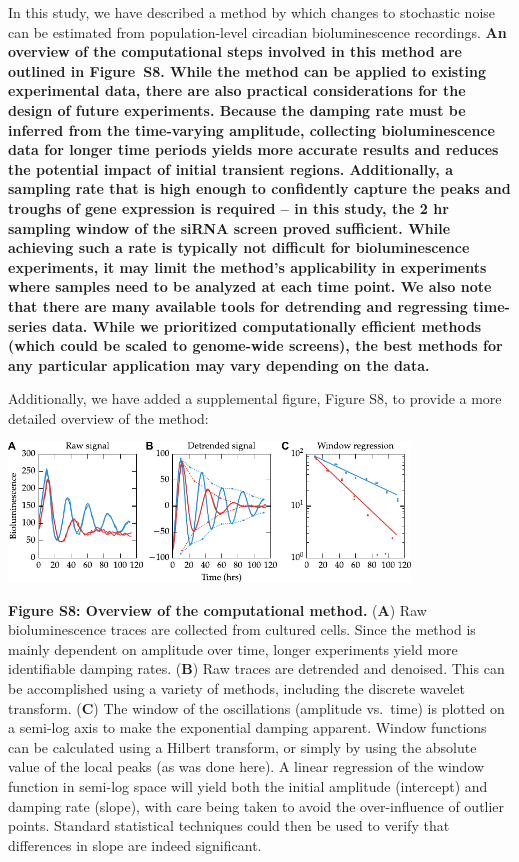 \documentclass[11pt, letterpaper]{article}
\newenvironment{manuscript}[1]{\begin{center}\begin{tcolorbox}[colback=green!5!white,colframe=green!75!black,width=\textwidth,title={#1},breakable,fonttitle=\bfseries]}{\end{tcolorbox}\end{center}}
\begin{document}
\begin{manuscript}{Page 15}
 In this study, we have described a method by which changes to stochastic noise can be estimated from population-level circadian bioluminescence recordings.
 {\bfseries
An overview of the computational steps involved in this method are outlined in Figure~S8.
While the method can be applied to existing experimental data, there are also practical considerations for the design of future experiments.
Because the damping rate must be inferred from the time-varying amplitude, collecting bioluminescence data for longer time periods yields more accurate results and reduces the potential impact of initial transient regions.
Additionally, a sampling rate that is high enough to confidently capture the peaks and troughs of gene expression is required -- in this study, the 2 hr sampling window of the siRNA screen proved sufficient.
While achieving such a rate is typically not difficult for bioluminescence experiments, it may limit the method's applicability in experiments where samples need to be analyzed at each time point.
We also note that there are many available tools for detrending and regressing time-series data.
While we prioritized computationally efficient methods (which could be scaled to genome-wide screens), the best methods for any particular application may vary depending on the data.
}
\end{manuscript}

Additionally, we have added a supplemental figure, Figure S8, to provide a more detailed overview of the method:

\begin{manuscript}{Page 23}
  \begin{center}
  \includegraphics[width=0.8\textwidth]{figures/pdfs/flowchart_schematic.pdf}
  \end{center}
{\bfseries Figure S8: Overview of the computational method.} ({\bfseries A}) Raw bioluminescence traces are collected from cultured cells. Since the method is mainly dependent on amplitude over time, longer experiments yield more identifiable damping rates. ({\bfseries B}) Raw traces are detrended and denoised. This can be accomplished using a variety of methods, including the discrete wavelet transform. ({\bfseries C}) The window of the oscillations (amplitude vs.\ time) is plotted on a semi-log axis to make the exponential damping apparent. Window functions can be calculated using a Hilbert transform, or simply by using the absolute value of the local peaks (as was done here). A linear regression of the window function in semi-log space will yield both the initial amplitude (intercept) and damping rate (slope), with care being taken to avoid the over-influence of outlier points. Standard statistical techniques could then be used to verify that differences in slope are indeed significant.
\end{manuscript}
\end{document}
